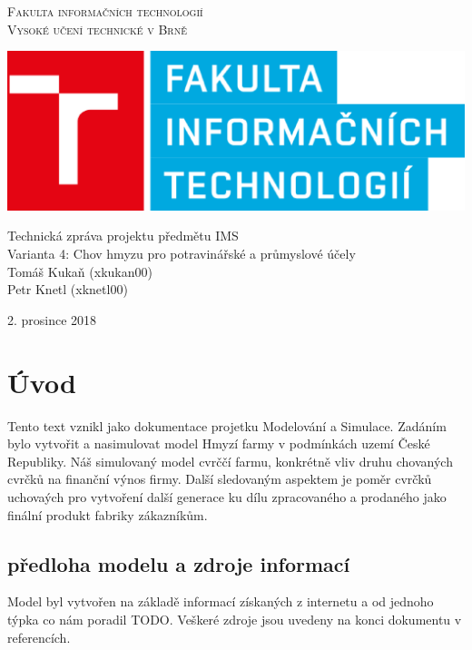 \documentclass[a4paper, 12pt]{article}
\begin{document}
\begin{center} 
\thispagestyle{empty}
\Huge
\textsc{Fakulta informačních technologií\\Vysoké učení
technické v Brně}\\

\includegraphics[scale = 0.5]{fit-logo.eps}


\LARGE Technická zpráva projektu předmětu IMS\\
\Huge Varianta 4: Chov hmyzu pro potravinářské a průmyslové účely \\
\Huge
Tomáš Kukaň (xkukan00) \\
Petr Knetl (xknetl00) \\

\end{center}
{\LARGE \hfill
2. prosince 2018}

\newpage

\tableofcontents
{}
\thispagestyle{empty}
\setcounter{page}{1}
\newpage

\section{Úvod}
Tento text vznikl jako dokumentace projetku Modelování a Simulace. Zadáním bylo vytvořit a nasimulovat model Hmyzí farmy v podmínkách uzemí České Republiky. Náš simulovaný model cvrččí farmu, konkrétně vliv druhu chovaných cvrčků na finanční výnos firmy. Další sledovaným aspektem je poměr cvrčků uchovaých pro vytvoření další generace ku dílu zpracovaného a prodaného jako finální produkt fabriky zákazníkům.

\subsection{předloha modelu a zdroje informací}
Model byl vytvořen na základě informací získaných z internetu a od jednoho týpka co nám poradil TODO. Veškeré zdroje jsou uvedeny na konci dokumentu v referencích.
\end{document}
